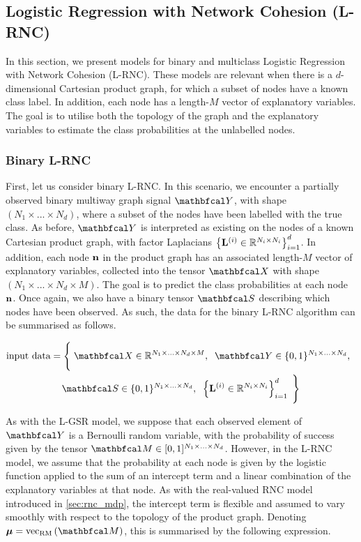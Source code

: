 \subsection{Logistic Regression with Network Cohesion (L-RNC)}

\label{sec:lrnc}

In this section, we present models for binary and multiclass Logistic Regression with Network Cohesion (L-RNC). These models are relevant when there is a $d$-dimensional Cartesian product graph, for which a subset of nodes have a known class label. In addition, each node has a length-$M$ vector of explanatory variables. The goal is to utilise both the topology of the graph and the explanatory variables to estimate the class probabilities at the unlabelled nodes. 

\subsubsection{Binary L-RNC}

First, let us consider binary L-RNC. In this scenario, we encounter a partially observed binary multiway graph signal $\Yt$, with shape $(N_1 \times ... \times N_d)$, where a subset of the nodes have been labelled with the true class. As before, $\Yt$ is interpreted as existing on the nodes of a known Cartesian product graph, with factor Laplacians $\left\{\mathbf{L}^{(i)} \in \mathbb{R}^{N_i \times N_i}\right\}_{i=1}^d$. In addition, each node $\mathbf{n}$ in the product graph has an associated length-$M$ vector of explanatory variables, collected into the tensor $\Xt$ with shape $(N_1 \times ... \times N_d \times M)$. The goal is to predict the class probabilities at each node $\mathbf{n}$. Once again, we also have a binary tensor $\St$ describing which nodes have been observed. As such, the data for the binary L-RNC algorithm can be summarised as follows. 

\begin{multline*}
    \text{input data} = \Bigg\{\;\Xt \in \R^{N_1 \times ... \times N_d \times M}, \;\; \Yt \in \{0, 1\}^{N_1 \times ... \times N_d}, \;\; \\ 
    \St \in \{0, 1\}^{N_1 \times ... \times N_d} , \;\; \left\{\LL^{(i)} \in \R^{N_i \times N_i}\right\}_{i=1}^d \; \Bigg\}
\end{multline*}

As with the L-GSR model, we suppose that each observed element of $\Yt$ is a Bernoulli random variable, with the probability of success given by the tensor $\Mt \in [0, 1]^{N_1 \times ... \times N_d}$. However, in the L-RNC model, we assume that the probability at each node is given by the logistic function applied to the sum of an intercept term and a linear combination of the explanatory variables at that node. As with the real-valued RNC model introduced in \cref{sec:rnc_mdp}, the intercept term is flexible and assumed to vary smoothly with respect to the topology of the product graph. Denoting $\muu = \vecrm{\Mt}$, this is summarised by the following expression. 

